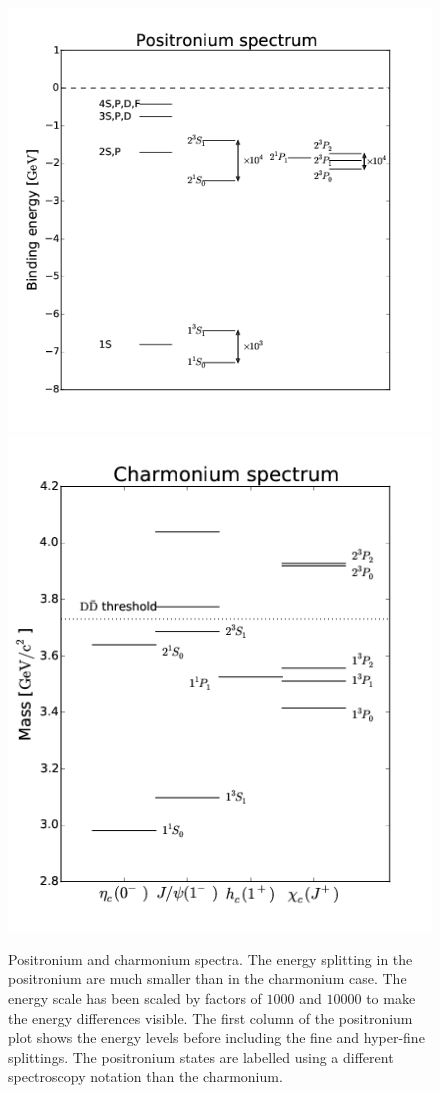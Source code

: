 \documentclass[12pt]{article}
\begin{document}
 \begin{figure}[h]
\begin{center} 
\includegraphics[scale=0.4]{images/Positronium.png}
\quad\includegraphics[scale=0.4]{images/Charmonium.png}
\end{center}
\caption{Positronium and charmonium spectra. The energy splitting in the positronium are much smaller than in the charmonium case. The energy scale has been scaled by factors of $1000$ and $10000$ to make the energy differences visible. The first column of the positronium plot shows the energy levels before including the fine and hyper-fine splittings. The positronium states are labelled using a different spectroscopy notation than the charmonium.}\label{fig:positronium}
 \end{figure}
\end{document}
